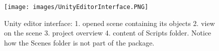 \begin{figure}[!htb]
	\texttt{[image: images/UnityEditorInterface.PNG]}
	\captionsetup{width=1.0\textwidth}
	\centering
	\caption{Unity editor interface: 1. opened scene containing its objects 2. view on the scene 3. project overview 4. content of Scripts folder. Notice how the Scenes folder is not part of the package.} 
\end{figure}





